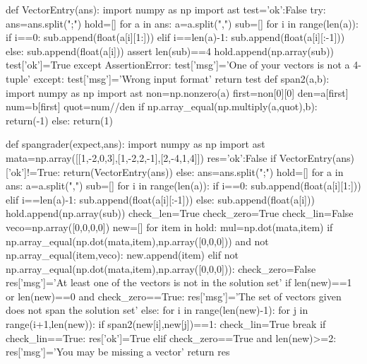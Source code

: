 
\begin{edXscript}

def VectorEntry(ans):
    import numpy as np
    import ast
    test={'ok':False}
    try:
        ans=ans.split(";")
        hold=[]
        for a in ans:
            a=a.split(",")
            sub=[]
            for i in range(len(a)):
                if i==0:
                    sub.append(float(a[i][1:]))
                elif i==len(a)-1:
                    sub.append(float(a[i][:-1]))
                else:
                    sub.append(float(a[i]))
            assert len(sub)==4
            hold.append(np.array(sub))
        test['ok']=True
    except AssertionError:
        test['msg']='One of your vectors is not a 4-tuple'
    except:
        test['msg']='Wrong input format'
    return test  
def span2(a,b):
    import numpy as np
    import ast
    non=np.nonzero(a)
    first=non[0][0]
    den=a[first]
    num=b[first]
    quot=num//den
    if np.array_equal(np.multiply(a,quot),b):
        return(-1)
    else:
        return(1)
        
def spangrader(expect,ans):
    import numpy as np
    import ast
    mata=np.array([[1,-2,0,3],[1,-2,2,-1],[2,-4,1,4]])
    res={'ok':False}
    if VectorEntry(ans)['ok']!=True:
        return(VectorEntry(ans))
    else:
        ans=ans.split(";")
        hold=[]
        for a in ans:
            a=a.split(",")
            sub=[]
            for i in range(len(a)):
                if i==0:
                    sub.append(float(a[i][1:]))
                elif i==len(a)-1:
                    sub.append(float(a[i][:-1]))
                else:
                    sub.append(float(a[i]))
            hold.append(np.array(sub))
        check_len=True
        check_zero=True
        check_lin=False
        veco=np.array([0,0,0,0])
        new=[]
        for item in hold:
            mul=np.dot(mata,item)
            if np.array_equal(np.dot(mata,item),np.array([0,0,0])) and not np.array_equal(item,veco):
                new.append(item)
            elif not np.array_equal(np.dot(mata,item),np.array([0,0,0])):
                check_zero=False
                res['msg']='At least one of the vectors is not in the solution set'
        if len(new)==1 or len(new)==0 and check_zero==True:
            res['msg']='The set of vectors given does not span the solution set'
        else:
            for i in range(len(new)-1):
                for j in range(i+1,len(new)):
                    if span2(new[i],new[j])==1:
                        check_lin=True
                        break
            if check_lin==True:
                res['ok']=True
            elif check_zero==True and len(new)>=2:
                res['msg']='You may be missing a vector'
        return res

\end{edXscript}
